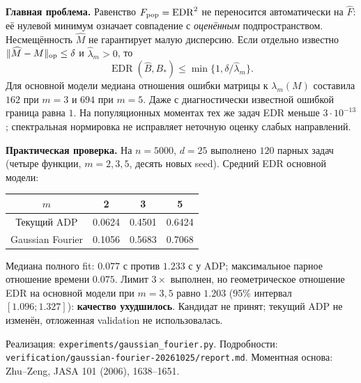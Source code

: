 \documentclass[10pt,a4paper]{article}
\newcommand{\EDR}{\operatorname{EDR}}
\newcommand{\norm}[1]{\lVert#1\rVert}
\begin{document}
\textbf{Главная проблема.}
Равенство $F_{\rm pop}=\EDR^2$ не переносится автоматически на
$\widehat F$: её нулевой минимум означает совпадение с \emph{оценённым}
подпространством. Несмещённость $\widehat M$ не гарантирует малую дисперсию.
Если отдельно известно $\norm{\widehat M-M}_{\rm op}\le\delta$ и
$\hat\lambda_m>0$, то
\[
 \EDR(\widehat B,B_*)\le\min\{1,\delta/\hat\lambda_m\}.
\]
Для основной модели медиана отношения ошибки матрицы к
$\lambda_m(M)$ составила $162$ при $m=3$ и $694$ при $m=5$.
Даже с диагностически известной ошибкой граница равна $1$.
На популяционных моментах тех же задач EDR меньше $3\cdot10^{-13}$;
спектральная нормировка не исправляет неточную оценку слабых направлений.

\textbf{Практическая проверка.}
На $n=5000$, $d=25$ выполнено $120$ парных задач
(четыре функции, $m=2,3,5$, десять новых seed).
Средний EDR основной модели:
\begin{center}
\begin{tabular}{c|ccc}
 $m$ & 2 & 3 & 5 \\ \hline
 Текущий ADP & 0.0624 & 0.4501 & 0.6424 \\
 Gaussian Fourier & 0.1056 & 0.5683 & 0.7068
\end{tabular}
\end{center}
\vspace{-5pt}
Медиана полного fit: $0.077$ с против $1.233$ с у ADP;
максимальное парное отношение времени $0.075$.
Лимит $3\times$ выполнен, но геометрическое отношение EDR на основной
модели при $m=3,5$ равно $1.203$ (95\% интервал $[1.096;1.327]$):
\textbf{качество ухудшилось}. Кандидат не принят; текущий ADP не изменён,
отложенная validation не использовалась.

\vfill
{\footnotesize
Реализация: \texttt{experiments/gaussian\_fourier.py}.
Подробности: \texttt{verification/gaussian-fourier-20261025/report.md}.
Моментная основа: Zhu--Zeng, JASA 101 (2006), 1638--1651.}
\end{document}
